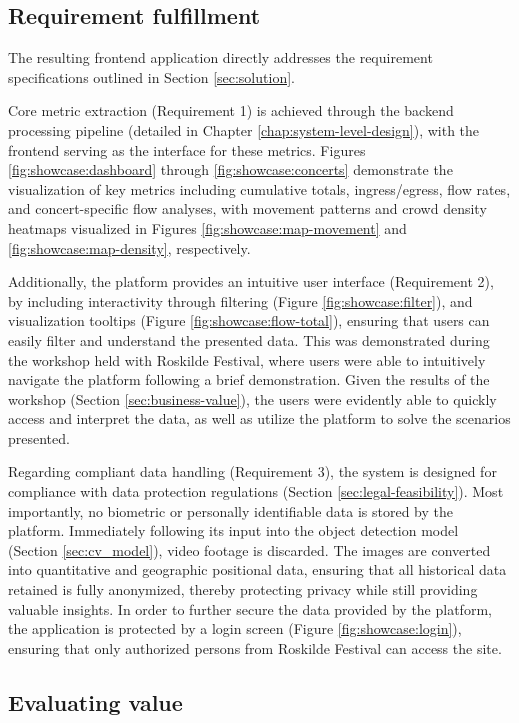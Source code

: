 \subsection{Requirement fulfillment}

The resulting frontend application directly addresses the requirement specifications outlined in Section \ref{sec:solution}.

Core metric extraction (Requirement 1) is achieved through the backend processing pipeline (detailed in Chapter \ref{chap:system-level-design}), with the frontend serving as the interface for these metrics. Figures \ref{fig:showcase:dashboard} through \ref{fig:showcase:concerts} demonstrate the visualization of key metrics including cumulative totals, ingress/egress, flow rates, and concert-specific flow analyses, with movement patterns and crowd density heatmaps visualized in Figures \ref{fig:showcase:map-movement} and \ref{fig:showcase:map-density}, respectively.

Additionally, the platform provides an intuitive user interface (Requirement 2), by including interactivity through filtering (Figure \ref{fig:showcase:filter}), and visualization tooltips (Figure \ref{fig:showcase:flow-total}), ensuring that users can easily filter and understand the presented data. This was demonstrated during the workshop held with Roskilde Festival, where users were able to intuitively navigate the platform following a brief demonstration. Given the results of the workshop (Section \ref{sec:business-value}), the users were evidently able to quickly access and interpret the data, as well as utilize the platform to solve the scenarios presented.

Regarding compliant data handling (Requirement 3), the system is designed for compliance with data protection regulations (Section \ref{sec:legal-feasibility}). Most importantly, no biometric or personally identifiable data is stored by the platform. Immediately following its input into the object detection model (Section \ref{sec:cv_model}), video footage is discarded. The images are converted into quantitative and geographic positional data, ensuring that all historical data retained is fully anonymized, thereby protecting privacy while still providing valuable insights. In order to further secure the data provided by the platform, the application is protected by a login screen (Figure \ref{fig:showcase:login}), ensuring that only authorized persons from Roskilde Festival can access the site.

\subsection{Evaluating value}

